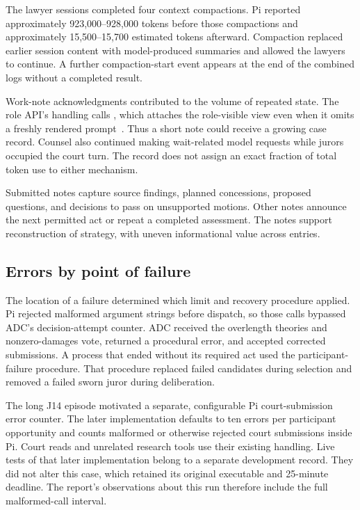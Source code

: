 The lawyer sessions completed four context compactions.  Pi reported approximately 923,000--928,000 tokens before those compactions and approximately 15,500--15,700 estimated tokens afterward.  Compaction replaced earlier session content with model-produced summaries and allowed the lawyers to continue.  A further compaction-start event appears at the end of the combined logs without a completed result.

Work-note acknowledgments contributed to the volume of repeated state.  The role API's  handling calls , which attaches the role-visible view even when it omits a freshly rendered prompt~\cite{roleapi}.  Thus a short note could receive a growing case record.  Counsel also continued making wait-related model requests while jurors occupied the court turn.  The record does not assign an exact fraction of total token use to either mechanism.

Submitted notes capture source findings, planned concessions, proposed questions, and decisions to pass on unsupported motions.  Other notes announce the next permitted act or repeat a completed assessment.  The notes support reconstruction of strategy, with uneven informational value across entries.

\subsection{Errors by point of failure}

The location of a failure determined which limit and recovery procedure applied.  Pi rejected malformed argument strings before dispatch, so those calls bypassed ADC's decision-attempt counter.  ADC received the overlength theories and nonzero-damages vote, returned a procedural error, and accepted corrected submissions.  A process that ended without its required act used the participant-failure procedure.  That procedure replaced failed candidates during selection and removed a failed sworn juror during deliberation.

The long J14 episode motivated a separate, configurable Pi court-submission error counter.  The later implementation defaults to ten errors per participant opportunity and counts malformed or otherwise rejected court submissions inside Pi.  Court reads and unrelated research tools use their existing handling.  Live tests of that later implementation belong to a separate development record.  They did not alter this case, which retained its original executable and 25-minute deadline.  The report's observations about this run therefore include the full malformed-call interval.

